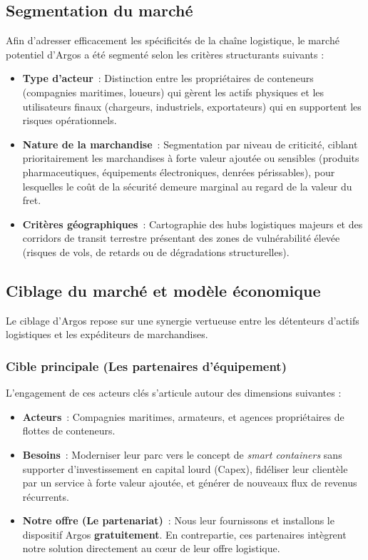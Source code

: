 \subsection{Segmentation du marché}
Afin d'adresser efficacement les spécificités de la chaîne logistique, le marché potentiel d'Argos a été segmenté selon les critères structurants suivants :
\begin{itemize}[label=\textcolor{argosblue}{\textbf{>}}]
    \item \textbf{Type d’acteur}~: Distinction entre les propriétaires de conteneurs (compagnies maritimes, loueurs) qui gèrent les actifs physiques et les utilisateurs finaux (chargeurs, industriels, exportateurs) qui en supportent les risques opérationnels.
    \item \textbf{Nature de la marchandise}~: Segmentation par niveau de criticité, ciblant prioritairement les marchandises à forte valeur ajoutée ou sensibles (produits pharmaceutiques, équipements électroniques, denrées périssables), pour lesquelles le coût de la sécurité demeure marginal au regard de la valeur du fret.
    \item \textbf{Critères géographiques}~: Cartographie des hubs logistiques majeurs et des corridors de transit terrestre présentant des zones de vulnérabilité élevée (risques de vols, de retards ou de dégradations structurelles)\cite{logcluster}.
\end{itemize}

\subsection{Ciblage du marché et modèle économique}

Le ciblage d'Argos repose sur une synergie vertueuse entre les détenteurs d'actifs logistiques et les expéditeurs de marchandises.

\subsubsection{Cible principale (Les partenaires d'équipement)}
L'engagement de ces acteurs clés s'articule autour des dimensions suivantes :
\begin{itemize}[label=\textcolor{argosblue}{\textbf{>}}]
    \item \textbf{Acteurs}~: Compagnies maritimes, armateurs, et agences propriétaires de flottes de conteneurs.
    \item \textbf{Besoins}~: Moderniser leur parc vers le concept de \textit{smart containers} sans supporter d'investissement en capital lourd (Capex), fidéliser leur clientèle par un service à forte valeur ajoutée, et générer de nouveaux flux de revenus récurrents.
    \item \textbf{Notre offre (Le partenariat)}~: Nous leur fournissons et installons le dispositif Argos \textbf{gratuitement}. En contrepartie, ces partenaires intègrent notre solution directement au cœur de leur offre logistique.
\end{itemize}

